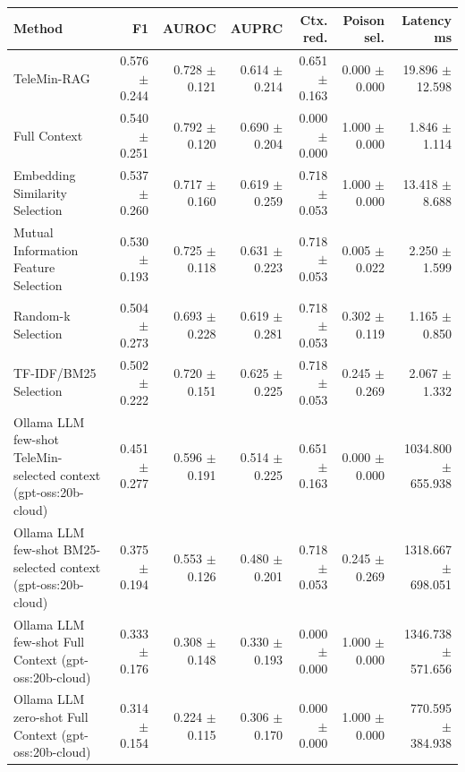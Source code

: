 \begin{tabular}{lrrrrrr}
\toprule
Method & F1 & AUROC & AUPRC & Ctx. red. & Poison sel. & Latency ms \\
\midrule
TeleMin-RAG & 0.576 $\pm$ 0.244 & 0.728 $\pm$ 0.121 & 0.614 $\pm$ 0.214 & 0.651 $\pm$ 0.163 & 0.000 $\pm$ 0.000 & 19.896 $\pm$ 12.598 \\
Full Context & 0.540 $\pm$ 0.251 & 0.792 $\pm$ 0.120 & 0.690 $\pm$ 0.204 & 0.000 $\pm$ 0.000 & 1.000 $\pm$ 0.000 & 1.846 $\pm$ 1.114 \\
Embedding Similarity Selection & 0.537 $\pm$ 0.260 & 0.717 $\pm$ 0.160 & 0.619 $\pm$ 0.259 & 0.718 $\pm$ 0.053 & 1.000 $\pm$ 0.000 & 13.418 $\pm$ 8.688 \\
Mutual Information Feature Selection & 0.530 $\pm$ 0.193 & 0.725 $\pm$ 0.118 & 0.631 $\pm$ 0.223 & 0.718 $\pm$ 0.053 & 0.005 $\pm$ 0.022 & 2.250 $\pm$ 1.599 \\
Random-k Selection & 0.504 $\pm$ 0.273 & 0.693 $\pm$ 0.228 & 0.619 $\pm$ 0.281 & 0.718 $\pm$ 0.053 & 0.302 $\pm$ 0.119 & 1.165 $\pm$ 0.850 \\
TF-IDF/BM25 Selection & 0.502 $\pm$ 0.222 & 0.720 $\pm$ 0.151 & 0.625 $\pm$ 0.225 & 0.718 $\pm$ 0.053 & 0.245 $\pm$ 0.269 & 2.067 $\pm$ 1.332 \\
Ollama LLM few-shot TeleMin-selected context (gpt-oss:20b-cloud) & 0.451 $\pm$ 0.277 & 0.596 $\pm$ 0.191 & 0.514 $\pm$ 0.225 & 0.651 $\pm$ 0.163 & 0.000 $\pm$ 0.000 & 1034.800 $\pm$ 655.938 \\
Ollama LLM few-shot BM25-selected context (gpt-oss:20b-cloud) & 0.375 $\pm$ 0.194 & 0.553 $\pm$ 0.126 & 0.480 $\pm$ 0.201 & 0.718 $\pm$ 0.053 & 0.245 $\pm$ 0.269 & 1318.667 $\pm$ 698.051 \\
Ollama LLM few-shot Full Context (gpt-oss:20b-cloud) & 0.333 $\pm$ 0.176 & 0.308 $\pm$ 0.148 & 0.330 $\pm$ 0.193 & 0.000 $\pm$ 0.000 & 1.000 $\pm$ 0.000 & 1346.738 $\pm$ 571.656 \\
Ollama LLM zero-shot Full Context (gpt-oss:20b-cloud) & 0.314 $\pm$ 0.154 & 0.224 $\pm$ 0.115 & 0.306 $\pm$ 0.170 & 0.000 $\pm$ 0.000 & 1.000 $\pm$ 0.000 & 770.595 $\pm$ 384.938 \\
\bottomrule
\end{tabular}
